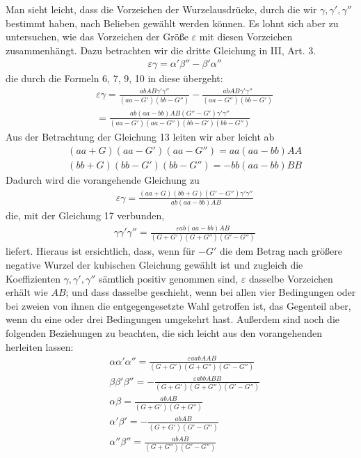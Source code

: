 Man sieht leicht, dass die Vorzeichen der Wurzelausdrücke, durch die wir $\gamma,\gamma',\gamma''$ bestimmt haben, nach Belieben gewählt werden können. Es lohnt sich aber zu untersuchen, wie das Vorzeichen der Größe $\varepsilon$ mit diesen Vorzeichen zusammenhängt. Dazu betrachten wir die dritte Gleichung in III, Art. 3.
\[
\begin{aligned}
&\varepsilon\gamma=\alpha'\beta''-\beta'\alpha''
\end{aligned}
\]
die durch die Formeln 6, 7, 9, 10 in diese übergeht:
\[
\begin{aligned}
&\varepsilon\gamma=\frac{abAB\gamma'\gamma''}{(aa-G')(bb-G'')}-\frac{abAB\gamma'\gamma''}{(aa-G'')(bb-G')}\\[8pt]
&=\frac{ab(aa-bb)AB(G''-G')\gamma'\gamma''}{(aa-G')(aa-G'')(bb-G')(bb-G'')}
\end{aligned}
\]
Aus der Betrachtung der Gleichung 13 leiten wir aber leicht ab
\[
\begin{aligned}
&(aa+G)(aa-G')(aa-G'')=aa(aa-bb)AA\\[8pt]
&(bb+G)(bb-G')(bb-G'')=-bb(aa-bb)BB
\end{aligned}
\]
Dadurch wird die vorangehende Gleichung zu
\[
\begin{aligned}
&\varepsilon\gamma=\frac{(aa+G)(bb+G)(G'-G'')\gamma'\gamma''}{ab(aa-bb)AB}
\end{aligned}
\]
die, mit der Gleichung 17 verbunden,
\[
\begin{aligned}
&\gamma\gamma'\gamma''=\frac{\varepsilon ab(aa-bb)AB}{(G+G')(G+G'')(G'-G'')}
\end{aligned}
\]
liefert. 
Hieraus ist ersichtlich, dass, wenn für $-G'$ die dem Betrag nach größere negative Wurzel der kubischen Gleichung gewählt ist und zugleich die Koeffizienten $\gamma,\gamma',\gamma''$ sämtlich positiv genommen sind, $\varepsilon$ dasselbe Vorzeichen erhält wie $AB$; und dass dasselbe geschieht, wenn bei allen vier Bedingungen oder bei zweien von ihnen die entgegengesetzte Wahl getroffen ist, das Gegenteil aber, wenn du eine oder drei Bedingungen umgekehrt hast. Außerdem sind noch die folgenden Beziehungen zu beachten, die sich leicht aus den vorangehenden herleiten lassen:
\[
\begin{aligned}
&\alpha\alpha'\alpha''=\frac{\varepsilon aabAAB}{(G+G')(G+G'')(G'-G'')}\\[8pt]
&\beta\beta'\beta''=-\frac{\varepsilon abbABB}{(G+G')(G+G'')(G'-G'')}\\[8pt]
&\alpha\beta=\frac{abAB}{(G+G')(G+G'')}\\[8pt]
&\alpha'\beta'=-\frac{abAB}{(G+G')(G'-G'')}\\[8pt]
&\alpha''\beta''=\frac{abAB}{(G+G'')(G'-G'')}
\end{aligned}
\]

\clearpage
\endgroup
